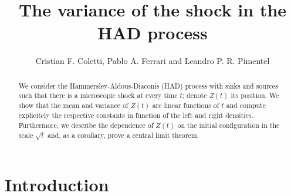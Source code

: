 \documentclass[reqno, 12pt]{amsart}
\begin{document}
\title[The variance of the shock ]{The variance of the shock in the HAD process}
\author{Cristian F. Coletti, Pablo A. Ferrari and Leandro P. R. Pimentel}
\address{Instituto de Matem\'atica\\
  Universidade de S\~{a}o Paulo\\
  Rua do Mat\~{a}o 1010 bloco D 05311-970 S\~{a}o Paulo SP Brazil\\}
 \urladdr{}

\keywords{}
\subjclass[2000]{}

\begin{abstract}
  We consider the Hammersley-Aldous-Diaconis (HAD) process with sinks and
  sources such that there is a microscopic shock at every time $t$; denote
  $Z(t)$ its position. We show that the mean and variance of $Z(t)$ are linear
  functions of $t$ and compute explicitely the respective constants in function
  of the left and right densities. Furthermore, we describe the dependence of
  $Z(t)$ on the initial configuration in the scale $\sqrt t$ and, as a
  corollary, prove a central limit theorem.
 \end{abstract}

\maketitle

\section{Introduction}
\end{document}
